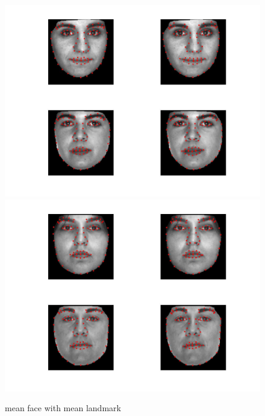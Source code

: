 \documentclass[12pt]{ctexart}
\begin{document}
\begin{enumerate}
\begin{figure}[H]
\includegraphics[scale=0.18]{b_com_face_lm12.jpg}
\includegraphics[scale=0.18]{b_com_face_lm13.jpg}
  \caption{mean face with mean landmark}
\end{figure}


\end{enumerate}
\end{document}
